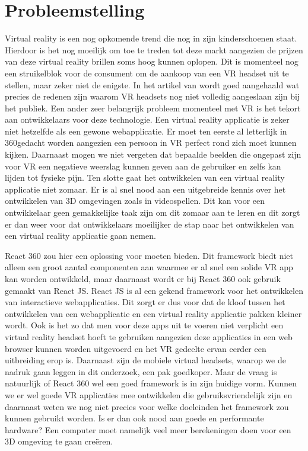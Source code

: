 \section{Probleemstelling}
\label{sec:probleemstelling}

Virtual reality is een nog opkomende trend die nog in zijn kinderschoenen staat. Hierdoor is het nog moeilijk om toe te treden tot deze markt aangezien de prijzen van deze virtual reality brillen soms hoog kunnen oplopen. Dit is momenteel nog een struikelblok voor de consument om de aankoop van een VR  headset uit te stellen, maar zeker niet de enigste. In het artikel van \autocite{Abarrera2017} wordt goed aangehaald wat precies de redenen zijn waarom VR headsets nog niet volledig aangeslaan zijn bij het publiek. Een ander zeer belangrijk probleem momenteel met VR is het tekort aan ontwikkelaars voor deze technologie. Een virtual reality applicatie is zeker niet hetzelfde als een gewone webapplicatie. Er moet ten eerste al letterlijk in 360\textdegree  gedacht worden aangezien een persoon in VR perfect rond zich moet kunnen kijken. Daarnaast mogen we niet vergeten dat bepaalde beelden die ongepast zijn voor VR een negatieve weerslag kunnen geven aan de gebruiker en zelfs kan lijden tot fysieke pijn. Ten slotte gaat het ontwikkelen van een virtual reality applicatie niet zomaar. Er is al snel nood aan een uitgebreide kennis over het ontwikkelen van 3D omgevingen zoals in videospellen. Dit kan voor een ontwikkelaar geen gemakkelijke taak zijn om dit zomaar aan te leren en dit zorgt er dan weer voor dat ontwikkelaars moeilijker de stap naar het ontwikkelen van een virtual reality applicatie gaan nemen.

React 360 zou hier een oplossing voor moeten bieden. Dit framework biedt niet alleen een groot aantal componenten aan waarmee er al snel een solide VR app kan worden ontwikkeld, maar daarnaast wordt er bij React 360 ook gebruik gemaakt van React JS. React JS is al een gekend framework voor het ontwikkelen van interactieve webapplicaties. Dit zorgt er dus voor dat de kloof tussen het ontwikkelen van een webapplicatie en een virtual reality applicatie pakken kleiner wordt. Ook is het zo dat men voor deze apps uit te voeren niet verplicht een virtual reality headset hoeft te gebruiken aangezien deze applicaties in een web browser kunnen worden uitgevoerd en het VR gedeelte ervan eerder een uitbreiding erop is. Daarnaast zijn de mobiele virtual headsets, waarop we de nadruk gaan leggen in dit onderzoek, een pak goedkoper. Maar de vraag is natuurlijk of React 360 wel een goed framework is in zijn huidige vorm. Kunnen we er wel goede VR applicaties mee ontwikkelen die gebruiksvriendelijk zijn en daarnaast weten we nog niet precies voor welke doeleinden het framework zou kunnen gebruikt worden. Is er dan ook nood aan goede en performante hardware? Een computer moet namelijk veel meer berekeningen doen voor een 3D omgeving te gaan creëren.


